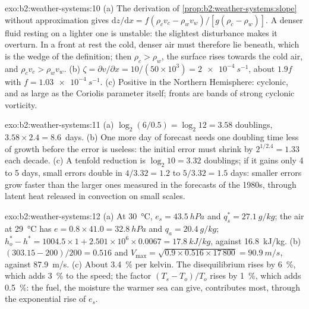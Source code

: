 \begin{solution}{exo:b2:weather-systems:10}
(a) The derivation of \cref{prop:b2:weather-systems:slope} without approximation gives
$\mathrm{d}z/\mathrm{d}x = f(\rho_c v_c - \rho_w v_w)/[g(\rho_c - \rho_w)]$. A denser fluid
resting on a lighter one is unstable: the slightest disturbance makes it overturn. In a front at
rest the cold, denser air must therefore lie beneath, which is the wedge of the definition; then
$\rho_c > \rho_w$, the surface rises towards the cold air, and $\rho_c v_c > \rho_w v_w$.
(b) $\zeta = \partial v/\partial x = 10/(50 \times 10^3) = \qty{2e-4}{s^{-1}}$, about $1.9f$ with
$f = \qty{1.03e-4}{s^{-1}}$. (c) Positive in the Northern Hemisphere: cyclonic, and as large as
the Coriolis parameter itself; fronts are bands of strong cyclonic vorticity.
\end{solution}

\begin{solution}{exo:b2:weather-systems:11}
(a) $\log_2(6/0.5) = \log_2 12 = 3.58$ doublings, $3.58 \times 2.4 = 8.6$~days. (b) One
more day of forecast needs one doubling time less of growth before the error is useless: the
initial error must shrink by $2^{1/2.4} = 1.33$ each decade. (c) A tenfold reduction is
$\log_2 10 = 3.32$ doublings; if it gains only 4 to 5 days, small errors double in $4/3.32 = 1.2$
to $5/3.32 = 1.5$ days: smaller errors grow faster than the larger ones measured in the
forecasts of the 1980s, through latent heat released in convection on small scales.
\end{solution}

\begin{solution}{exo:b2:weather-systems:12}
(a) At \qty{30}{\celsius}, $e_s = \qty{43.5}{hPa}$ and $q_s^* = \qty{27.1}{g/kg}$; the air at
\qty{29}{\celsius} has $e = 0.8 \times 41.0 = \qty{32.8}{hPa}$ and $q_a = \qty{20.4}{g/kg}$;
$h_o^* - h^* = 1004.5 \times 1 + 2.501 \times 10^6 \times 0.0067 = \qty{17.8}{kJ/kg}$, against
\qty{16.8}{kJ/kg}. (b) $(303.15 - 200)/200 = 0.516$ and $V_{\max} = \sqrt{0.9 \times 0.516
\times 17\,800} = \qty{90.9}{m/s}$, against \qty{87.9}{m/s}. (c) About \qty{3.4}{\percent} per
kelvin. The disequilibrium rises by \qty{6}{\percent}, which adds \qty{3}{\percent} to the speed;
the factor $(T_s - T_o)/T_o$ rises by \qty{1}{\percent}, which adds \qty{0.5}{\percent}: the
fuel, the moisture the warmer sea can give, contributes most, through the exponential rise of
$e_s$.
\end{solution}

